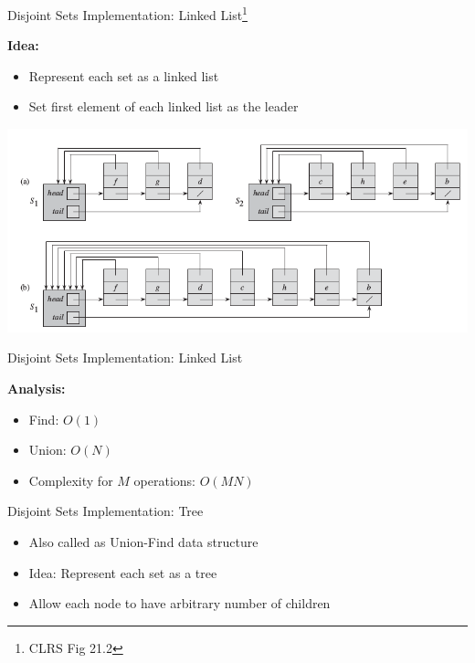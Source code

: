 \documentclass{beamer}
\begin{document}
\begin{frame}{Disjoint Sets Implementation: Linked List\footnote{CLRS Fig 21.2}}

        {\bf Idea:} 
        \begin{itemize}
            \item Represent each set as a linked list
            \item Set first element of each linked list as the leader
        \end{itemize}

        \begin{center}
            \includegraphics[scale=0.4]{unionFindLinkedList.png}
        \end{center}

\end{frame}

\begin{frame}{Disjoint Sets Implementation: Linked List}

    {\bf Analysis:}
    \begin{itemize}
        \item Find: \pause $O(1)$
        \item Union: \pause $O(N)$
        \item Complexity for $M$ operations: $O(MN)$
    \end{itemize}
\end{frame}

\begin{frame}{Disjoint Sets Implementation: Tree}
    \begin{itemize}
        \item Also called as Union-Find data structure
        \item Idea: Represent each set as a tree
        \item Allow each node to have arbitrary number of children
    \end{itemize}
\end{frame}
\end{document}
